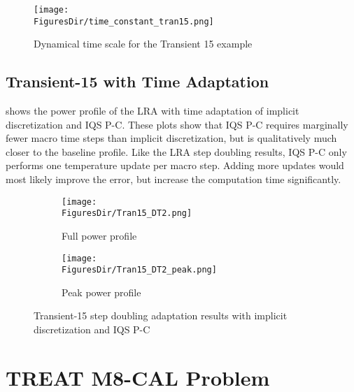 \begin{figure}[htbp!]
\centering
\texttt{[image: \\FiguresDir/time\_constant\_tran15.png]}
\caption{Dynamical time scale for the Transient 15 example}
\label{fig:tran15tc}
\end{figure}

\subsection{Transient-15 with Time Adaptation}

 shows the power profile of the LRA with time adaptation of implicit discretization and IQS P-C.  These plots show that IQS P-C requires marginally fewer macro time steps than implicit discretization, but is qualitatively much closer to the baseline profile. Like the LRA step doubling results, IQS P-C only performs one temperature update per macro step. Adding more updates would most likely improve the error, but increase the computation time significantly. 

\begin{figure}[!htbp]
\centering
\begin{subfigure}[!htbp]{0.49\textwidth}
\texttt{[image: \\FiguresDir/Tran15\_DT2.png]}
\caption{Full power profile}
\end{subfigure}
\begin{subfigure}[!htbp]{0.49\textwidth}
\texttt{[image: \\FiguresDir/Tran15\_DT2\_peak.png]}
\caption{Peak power profile}
\end{subfigure}
\caption{Transient-15 step doubling adaptation results with implicit discretization and IQS P-C}
\label{fig:Tran15_dt2}
\end{figure}

\section{TREAT M8-CAL Problem}